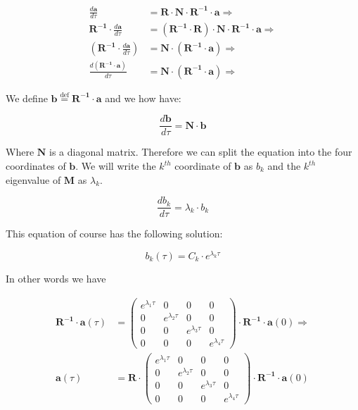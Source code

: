 \documentclass{article}
\newcommand{\vect}[1]{\mathbf{#1}}
\newcommand{\mat}[1]{\mathbf{#1}}
\newcommand*{\defeq}{\stackrel{\text{def}}{=}}
\begin{document}
\begin{align*}
\frac{d \vect a}{d\tau} &= \mat{R} \cdot \mat{N} \cdot \mat{R^{-1}} \cdot \vect a \Rightarrow \\
\mat{R^{-1}} \cdot \frac{d \vect a}{d\tau} &= (\mat{R^{-1}} \cdot \mat{R}) \cdot \mat{N} \cdot \mat{R^{-1}} \cdot \vect a \Rightarrow \\
(\mat{R^{-1}} \cdot \frac{d \vect a}{d\tau}) &= \mat{N} \cdot (\mat{R^{-1}} \cdot \vect a) \Rightarrow \\
\frac{d(\mat{R^{-1}} \cdot \vect a)}{d\tau} &= \mat{N} \cdot (\mat{R^{-1}} \cdot \vect a) \Rightarrow
\end{align*}

We define $\vect b \defeq \mat{R^{-1}} \cdot \vect a$ and we how have:

\[\frac{d\vect b}{d\tau} = \mat{N} \cdot \vect b
\]

Where $\mat{N}$ is a diagonal matrix. Therefore we can split the equation into the four coordinates of $\vect b$. We will write the $k^{th}$ coordinate of $\vect b$ as $b_k$ and the $k^{th}$ eigenvalue of $\mat{M}$ as $\lambda_k$.

\[\frac{db_k}{d\tau} = \lambda_k \cdot b_k\]

This equation of course has the following solution:

\[b_k(\tau) = C_k \cdot e^{\lambda_k\tau}\]

In other words we have

\begin{align*}
    \mat{R^{-1}} \cdot \vect a(\tau) &= \begin{pmatrix}
        e^{\lambda_1\tau} & 0 & 0 & 0 \\
        0 & e^{\lambda_2\tau} & 0 & 0 \\
        0 & 0 & e^{\lambda_3\tau} & 0 \\
        0 & 0 & 0 & e^{\lambda_4\tau}
    \end{pmatrix} \cdot \mat{R^{-1}}\cdot \vect a(0) \Rightarrow \\
    \vect a(\tau) &= \mat{R} \cdot \begin{pmatrix}
        e^{\lambda_1\tau} & 0 & 0 & 0 \\
        0 & e^{\lambda_2\tau} & 0 & 0 \\
        0 & 0 & e^{\lambda_3\tau} & 0 \\
        0 & 0 & 0 & e^{\lambda_4\tau}
    \end{pmatrix} \cdot \mat{R^{-1}}\cdot \vect a(0)
\end{align*}
\end{document}
